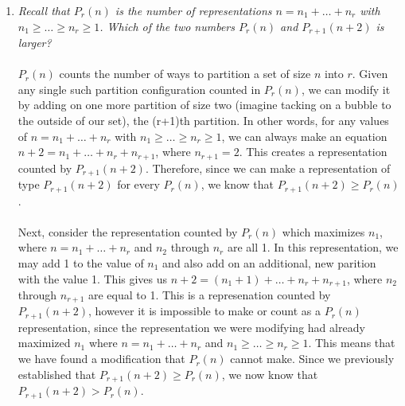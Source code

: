 \documentclass[12pt]{article}
\begin{document}
\begin{enumerate}
\item \emph{Recall that $P_r(n)$ is the number of representations $n = n_1 + \dots + n_r$ with $n_1 \geq \dots \geq n_r \geq 1$. Which of the two numbers $P_r(n)$ and $P_{r+1}(n + 2)$ is larger?} \\
\\
$P_r(n)$ counts the number of ways to partition a set of size $n$ into $r$. Given any single such partition configuration counted in $P_r(n)$, we can modify it by adding on one more partition of size two (imagine tacking on a bubble to the outside of our set), the (r+1)th partition. In other words, for any values of $n = n_1 + \dots + n_r$ with $n_1 \geq \dots \geq n_r \geq 1$, we can always make an equation $n+2 = n_1 + \dots + n_r+n_{r+1}$, where $n_{r+1} = 2$. This creates a representation counted by $P_{r+1}(n + 2)$. Therefore, since we can make a representation of type $P_{r+1}(n + 2)$ for every $P_r(n)$, we know that $P_{r+1}(n + 2) \geq P_r(n)$. \\
\\
Next, consider the representation counted by $P_r(n)$ which maximizes $n_1$, where $n = n_1 + \dots + n_r$ and $n_2$ through $n_r$ are all 1. In this representation, we may add 1 to the value of $n_1$ and also add on an additional, new parition with the value 1. This gives us $n+2=(n_1+1)+\dots+n_r+n_{r+1}$, where $n_2$ through $n_{r+1}$ are equal to 1. This is a represenation counted by $P_{r+1}(n + 2)$, however it is impossible to make or count as a $P_r(n)$ representation, since the representation we were modifying had already maximized $n_1$ where $n = n_1 + \dots + n_r$ and $n_1 \geq \dots \geq n_r \geq 1$. This means that we have found a modification that $P_r(n)$ cannot make. Since we previously established that $P_{r+1}(n + 2) \geq P_r(n)$, we now know that $P_{r+1}(n + 2) > P_r(n)$.



\end{enumerate}
\end{document}

